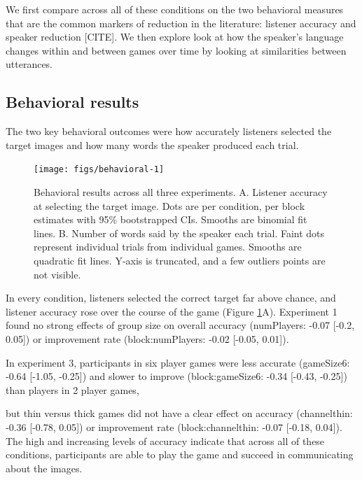 \documentclass[
  english,
  a4paper,
]{article}
\begin{document}
We first compare across all of these conditions on the two behavioral measures that are the common markers of reduction in the literature: listener accuracy and speaker reduction {[}CITE{]}. We then explore look at how the speaker's language changes within and between games over time by looking at similarities between utterances.

\hypertarget{behavioral-results}{%
\subsection{Behavioral results}\label{behavioral-results}}

The two key behavioral outcomes were how accurately listeners selected the target images and how many words the speaker produced each trial.

\begin{figure}[t!]

{\centering \texttt{[image: figs/behavioral-1]} 

}

\caption{Behavioral results across all three experiments. A. Listener accuracy at selecting the target image. Dots are per condition, per block estimates with 95\% bootstrapped CIs. Smooths are binomial fit lines. B. Number of words said by the speaker each trial. Faint dots represent individual trials from individual games. Smooths are quadratic fit lines. Y-axis is truncated, and a few outliers points are not visible. }\label{fig:behavioral}
\end{figure}

In every condition, listeners selected the correct target far above chance, and listener accuracy rose over the course of the game (Figure \ref{fig:behavioral}A). Experiment 1 found no strong effects of group size on overall accuracy (numPlayers: -0.07 {[}-0.2, 0.05{]}) or improvement rate (block:numPlayers: -0.02 {[}-0.05, 0.01{]}).

In experiment 3, participants in six player games were less accurate (gameSize6: -0.64 {[}-1.05, -0.25{]}) and slower to improve (block:gameSize6: -0.34 {[}-0.43, -0.25{]}) than players in 2 player games,

but thin versus thick games did not have a clear effect on accuracy (channelthin: -0.36 {[}-0.78, 0.05{]}) or improvement rate (block:channelthin: -0.07 {[}-0.18, 0.04{]}). The high and increasing levels of accuracy indicate that across all of these conditions, participants are able to play the game and succeed in communicating about the images.
\end{document}
